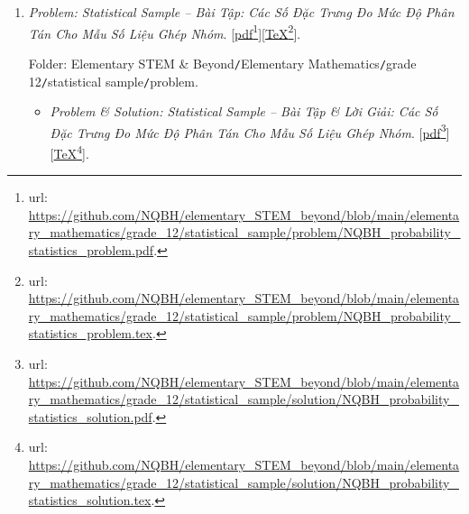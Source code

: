 \documentclass[12pt,oneside]{book}
\begin{document}
\begin{enumerate}
	Folder: {\sf Elementary STEM \& Beyond{\tt/}Elementary Mathematics{\tt/}grade 12{\tt/}3D vector{\tt/}problem}.
	\begin{itemize}
		\item {\it Problem \& Solution: Coordinates of Vectors in 3D Space -- Bài Tập \& Lời Giải: Tọa Độ Của Vector Trong Không Gian}. [\href{https://github.com/NQBH/elementary_STEM_beyond/blob/main/elementary_mathematics/grade_12/3D_vector/solution/NQBH_3D_vector_solution.pdf}{pdf}\footnote{{\sc url}: \url{https://github.com/NQBH/elementary_STEM_beyond/blob/main/elementary_mathematics/grade_12/3D_vector/solution/NQBH_3D_vector_solution.pdf}.}][\href{https://github.com/NQBH/elementary_STEM_beyond/blob/main/elementary_mathematics/grade_12/3D_vector/solution/NQBH_3D_vector_solution.tex}{\TeX}\footnote{{\sc url}: \url{https://github.com/NQBH/elementary_STEM_beyond/blob/main/elementary_mathematics/grade_12/3D_vector/solution/NQBH_3D_vector_solution.tex}.}].
		
		Folder: {\sf Elementary STEM \& Beyond{\tt/}Elementary Mathematics{\tt/}grade 12{\tt/}3D vector {\tt/}solution}.
	\end{itemize}
	\item {\it Problem: Statistical Sample -- Bài Tập: Các Số Đặc Trưng Đo Mức Độ Phân Tán Cho Mẫu Số Liệu Ghép Nhóm}. [\href{https://github.com/NQBH/elementary_STEM_beyond/blob/main/elementary_mathematics/grade_12/statistical_sample/problem/NQBH_probability_statistics_problem.pdf}{pdf}\footnote{{\sc url}: \url{https://github.com/NQBH/elementary_STEM_beyond/blob/main/elementary_mathematics/grade_12/statistical_sample/problem/NQBH_probability_statistics_problem.pdf}.}][\href{https://github.com/NQBH/elementary_STEM_beyond/blob/main/elementary_mathematics/grade_12/statistical_sample/problem/NQBH_probability_statistics_problem.tex}{\TeX}\footnote{{\sc url}: \url{https://github.com/NQBH/elementary_STEM_beyond/blob/main/elementary_mathematics/grade_12/statistical_sample/problem/NQBH_probability_statistics_problem.tex}.}].
	
	Folder: {\sf Elementary STEM \& Beyond{\tt/}Elementary Mathematics{\tt/}grade 12{\tt/}statistical sample{\tt/}problem}.
	\begin{itemize}
		\item {\it Problem \& Solution: Statistical Sample -- Bài Tập \& Lời Giải: Các Số Đặc Trưng Đo Mức Độ Phân Tán Cho Mẫu Số Liệu Ghép Nhóm}. [\href{https://github.com/NQBH/elementary_STEM_beyond/blob/main/elementary_mathematics/grade_12/statistical_sample/solution/NQBH_probability_statistics_solution.pdf}{pdf}\footnote{{\sc url}: \url{https://github.com/NQBH/elementary_STEM_beyond/blob/main/elementary_mathematics/grade_12/statistical_sample/solution/NQBH_probability_statistics_solution.pdf}.}][\href{https://github.com/NQBH/elementary_STEM_beyond/blob/main/elementary_mathematics/grade_12/statistical_sample/solution/NQBH_probability_statistics_solution.tex}{\TeX}\footnote{{\sc url}: \url{https://github.com/NQBH/elementary_STEM_beyond/blob/main/elementary_mathematics/grade_12/statistical_sample/solution/NQBH_probability_statistics_solution.tex}.}].
		

\end{itemize}
\end{enumerate}
\end{document}
